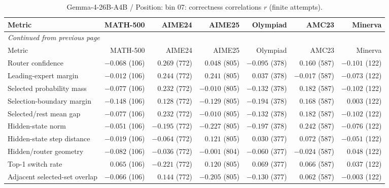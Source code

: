 \begingroup\scriptsize\setlength{\tabcolsep}{4pt}
\begin{longtable}{@{}lrrrrrr@{}}
\caption{Gemma-4-26B-A4B / Position: bin 07: correctness correlations $r$ (finite attempts).}\label{tab:multi-gemma-position-bin_07}\\
\toprule
Metric & MATH-500 & AIME24 & AIME25 & Olympiad & AMC23 & Minerva \\
\midrule\endfirsthead
\multicolumn{7}{l}{\textit{Continued from previous page}}\\
\toprule
Metric & MATH-500 & AIME24 & AIME25 & Olympiad & AMC23 & Minerva \\
\midrule\endhead
\bottomrule\endfoot
Router confidence & $-0.068$ (106) & $0.269$ (772) & $0.048$ (805) & $-0.095$ (378) & $0.160$ (587) & $-0.101$ (122) \\
Leading-expert margin & $-0.012$ (106) & $0.244$ (772) & $0.241$ (805) & $0.037$ (378) & $-0.017$ (587) & $-0.073$ (122) \\
Selected probability mass & $-0.077$ (106) & $0.232$ (772) & $-0.010$ (805) & $-0.132$ (378) & $0.182$ (587) & $-0.102$ (122) \\
Selection-boundary margin & $-0.148$ (106) & $0.128$ (772) & $-0.129$ (805) & $-0.194$ (378) & $0.168$ (587) & $0.003$ (122) \\
Selected/rest mean gap & $-0.077$ (106) & $0.232$ (772) & $-0.010$ (805) & $-0.132$ (378) & $0.182$ (587) & $-0.102$ (122) \\
Hidden-state norm & $-0.051$ (106) & $-0.195$ (772) & $-0.227$ (805) & $-0.197$ (378) & $0.242$ (587) & $-0.076$ (122) \\
Hidden-state step distance & $-0.019$ (106) & $-0.064$ (772) & $0.121$ (805) & $0.030$ (377) & $0.072$ (587) & $-0.051$ (122) \\
Hidden/router geometry & $-0.082$ (106) & $-0.036$ (772) & $-0.001$ (804) & $-0.060$ (377) & $-0.024$ (587) & $0.048$ (122) \\
Top-1 switch rate & $0.065$ (106) & $-0.221$ (772) & $0.120$ (805) & $0.069$ (377) & $0.066$ (587) & $0.037$ (122) \\
Adjacent selected-set overlap & $-0.066$ (106) & $0.144$ (772) & $-0.205$ (805) & $-0.130$ (377) & $0.062$ (587) & $-0.003$ (122) \\
\end{longtable}\endgroup

